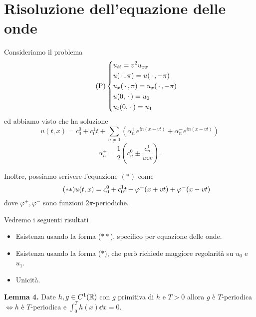 
\section{Risoluzione dell'equazione delle onde}

Consideriamo il problema
\begin{equation}
	\tag{P}
	\left\{
	\begin{aligned}
			& u_{tt} = v^2 u_{xx} \\
			& u(\,\cdot\,, \pi) = u(\,\cdot\,, -\pi) \\
			& u_x(\,\cdot\,, \pi) = u_x(\,\cdot\,, -\pi) \\
			& u(0,\,\cdot\,) = u_0 \\
			& u_t(0,\,\cdot\,) = u_1
	\end{aligned}
	\right.
\end{equation}
ed abbiamo visto che ha soluzione
\begin{equation}
	\tag{$*$}
	u(t,x) = c_0^0 + c_0^1 t + \sum_{n \neq  0} (\alpha_n^+ e^{in(x + vt)} + \alpha_n^- e^{in(x - vt)})
\end{equation}
$$
	\alpha^{\pm}_n = \frac{1}{2}\left( c_n^0 \pm \frac{c^1_n}{i n v} \right).
$$

Inoltre, possiamo scrivere l'equazione $(*)$ come
\begin{equation}
	\tag{$**$}
	u(t,x) = c_0^0 + c_0^1 t + \varphi^+(x + vt) + \varphi^-(x - vt)
\end{equation}
dove $\varphi^+, \varphi^-$ sono funzioni $2\pi$-periodiche.

Vedremo i seguenti risultati

\begin{itemize}
	\item Esistenza usando la forma ($**$), specifico per equazione delle onde.
	\item Esistenza usando la forma ($*$), che però richiede maggiore regolarità su $u_0$ e $u_1$.
	\item Unicità.
\end{itemize}


\textbf{Lemma 4.}
Date $h, g \in C^1(\mathbb R)$ con $g$ primitiva di $h$ e $T > 0$ allora $g$ è $T$-periodica $\iff h$ è $T$-periodica e $\int_0^T h(x) \dd x = 0$.

